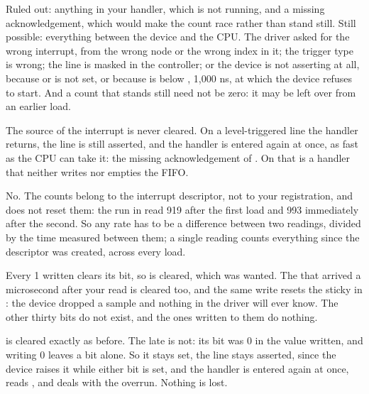  Ruled out: anything in your handler, which is not running, and a missing
acknowledgement, which would make the count race rather than stand still. Still possible:
everything between the device and the CPU. The driver asked for the wrong interrupt, from the wrong
node or the wrong index in it; the trigger type is wrong; the line is masked in the controller; or
the device is not asserting at all, because  or  is not set, or because
 is below , 1,000 ns, at which the device refuses to
start. And a count that stands still need not be zero: it may be left over from an earlier load.

 The source of the interrupt is never cleared. On a level-triggered line the handler
returns, the line is still asserted, and the handler is entered again at once, as fast as the CPU
can take it: the missing acknowledgement of . On  that is a handler
that neither writes  nor empties the FIFO.

 No. The counts belong to the interrupt descriptor, not to your registration, and
 does not reset them: the run in  read 919 after the first load
and 993 immediately after the second. So any rate has to be a difference between two readings,
divided by the time measured between them; a single reading counts everything since the descriptor
was created, across every load.


 Every 1 written clears its bit, so  is cleared, which was wanted. The
 that arrived a microsecond after your read is cleared too, and the same write resets
the sticky  in : the device dropped a sample and nothing in the driver
will ever know. The other thirty bits do not exist, and the ones written to them do nothing.

  is cleared exactly as before. The late  is not: its bit was 0
in the value written, and writing 0 leaves a bit alone. So it stays set, the line stays asserted,
since the device raises it while either bit is set, and the handler is entered again at once,
reads , and deals with the overrun. Nothing is lost.

